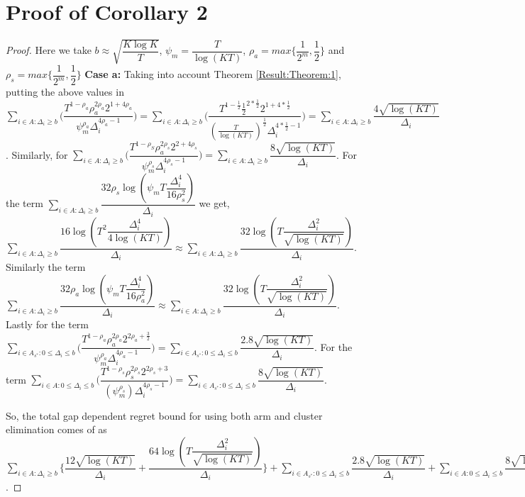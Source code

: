\section{Proof of Corollary 2}
\label{App:Proof:Corollary:2}
\begin{proof}
Here we take $b\approx\sqrt{\dfrac{K\log K}{T}}$, $\psi_{m}=\dfrac{T}{\log(KT)}$, $\rho_{a}=max\bigg\lbrace\dfrac{1}{2^{m}},\dfrac{1}{2}\bigg\rbrace$ and $\rho_{s}=max\bigg\lbrace\dfrac{1}{2^{m}},\dfrac{1}{2}\bigg\rbrace$
\textbf{Case a:} Taking into account Theorem \ref{Result:Theorem:1}, putting the above values in $\sum_{i\in A:\Delta_{i}\geq b}\bigg(\dfrac{T^{1-\rho_{a}}\rho_{a}^{2\rho_{a}}2^{1+4\rho_{a}}}{\psi_{m}^{\rho_{a}}\Delta_{i}^{4\rho_{a}-1}} \bigg)= \sum_{i\in A:\Delta_{i}\geq b}\bigg(\dfrac{T^{1-\frac{1}{2}}\frac{1}{2}^{2*\frac{1}{2}}2^{1+4*\frac{1}{2}}}{(\frac{T}{\log (KT)})^{\frac{1}{2}}\Delta_{i}^{4*\frac{1}{2}-1}} \bigg)=\sum_{i\in A:\Delta_{i}\geq b}\dfrac{4\sqrt{\log (KT)}}{\Delta_{i}}$. Similarly, for $\sum_{i\in A:\Delta_{i}\geq b}\bigg(\dfrac{T^{1-\rho_{S}}\rho_{a}^{2\rho_{s}}2^{2+4\rho_{s}}}{\psi_{m}^{\rho_{s}}\Delta_{i}^{4\rho_{s}-1}} \bigg) = \sum_{i\in A:\Delta_{i}\geq b}\dfrac{8\sqrt{\log (KT)}}{\Delta_{i}}$.
 For the term $\sum_{i\in A:\Delta_{i}\geq b}\dfrac{32\rho_{s}\log{(\psi_{m}T\dfrac{\Delta_{i}^{4}}{16\rho_{s}^{2}})}}{\Delta_{i}}$ we get,
$\sum_{i\in A:\Delta_{i}\geq b}\dfrac{16\log{(T^{2}\dfrac{\Delta_{i}^{4}}{4\log (KT)})}}{\Delta_{i}}\approx \sum_{i\in A:\Delta_{i}\geq b}\dfrac{32\log{(T\dfrac{\Delta_{i}^{2}}{\sqrt{\log (KT)}})}}{\Delta_{i}}$. Similarly the term $\sum_{i\in A:\Delta_{i}\geq b}\dfrac{32\rho_{a}\log{(\psi_{m}T\dfrac{\Delta_{i}^{4}}{16\rho_{a}^{2}})}}{\Delta_{i}}\approx \sum_{i\in A:\Delta_{i}\geq b}\dfrac{32\log{(T\dfrac{\Delta_{i}^{2}}{\sqrt{\log (KT)}})}}{\Delta_{i}}$.
 Lastly for the term $\sum\limits_{i\in A_{s^{*}}:0\leq\Delta_{i}\leq b}\bigg(\dfrac{T^{1-\rho_{a}}\rho_{a}^{2\rho_{a}}2^{2\rho_{a}+\frac{3}{2}}}{\psi_{m}^{\rho_{a}}\Delta_{i}^{4\rho_{a}-1}} \bigg)= \sum\limits_{i\in A_{s^{*}}:0\leq\Delta_{i}\leq b}\dfrac{2.8\sqrt{\log (KT)}}{\Delta_{i}}$. For the term $\sum\limits_{i\in A:0\leq\Delta_{i}\leq b}\bigg(\dfrac{T^{1-\rho_{s}}\rho_{s}^{2\rho_{s}}2^{2\rho_{s}+3}}{(\psi_{m}^{\rho_{s}})\Delta_{i}^{4\rho_{s} -1}} \bigg)=\sum\limits_{i\in A_{s^{*}}:0\leq\Delta_{i}\leq b}\dfrac{8\sqrt{\log (KT)}}{\Delta_{i}}$.

 So, the total gap dependent regret bound for using both arm and cluster elimination comes of as $ \sum_{i\in A:\Delta_{i}\geq b}\bigg\lbrace\dfrac{12\sqrt{\log (KT)}}{\Delta_{i}}  + \dfrac{64\log{(T\dfrac{\Delta_{i}^{2}}{\sqrt{\log (KT)}})}}{\Delta_{i}}\bigg\rbrace + \sum\limits_{i\in A_{s^{*}}:0\leq\Delta_{i}\leq b}\dfrac{2.8\sqrt{\log (KT)}}{\Delta_{i}} + \sum\limits_{i\in A:0\leq\Delta_{i}\leq b}\dfrac{8\sqrt{\log (KT)}}{\Delta_{i}} $.
\end{proof}

